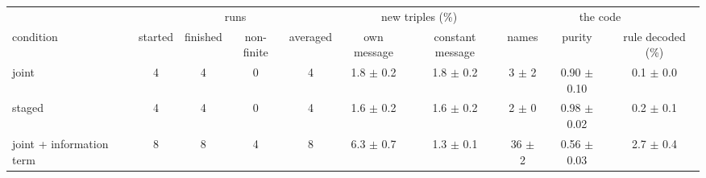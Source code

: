 \begin{tabular}{lccccccccc}\toprule
 & \multicolumn{4}{c}{runs} & \multicolumn{2}{c}{new triples (\%)} & \multicolumn{3}{c}{the code} \\ \cmidrule(lr){2-5}\cmidrule(lr){6-7}\cmidrule(lr){8-10}
condition & started & finished & non-finite & averaged & own message & constant message & names & purity & rule decoded (\%) \\ \midrule
joint & 4 & 4 & 0 & 4 & 1.8 $\pm$ 0.2 & 1.8 $\pm$ 0.2 & 3 $\pm$ 2 & 0.90 $\pm$ 0.10 & 0.1 $\pm$ 0.0 \\
staged & 4 & 4 & 0 & 4 & 1.6 $\pm$ 0.2 & 1.6 $\pm$ 0.2 & 2 $\pm$ 0 & 0.98 $\pm$ 0.02 & 0.2 $\pm$ 0.1 \\
joint + information term & 8 & 8 & 4 & 8 & 6.3 $\pm$ 0.7 & 1.3 $\pm$ 0.1 & 36 $\pm$ 2 & 0.56 $\pm$ 0.03 & 2.7 $\pm$ 0.4 \\
\bottomrule
\end{tabular}
